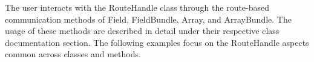 
The user interacts with the RouteHandle class through the route-based communication methods of Field, FieldBundle, Array, and ArrayBundle. The usage of these methods are described in detail under their respective class documentation section. The following examples focus on the RouteHandle aspects common across classes and methods.
